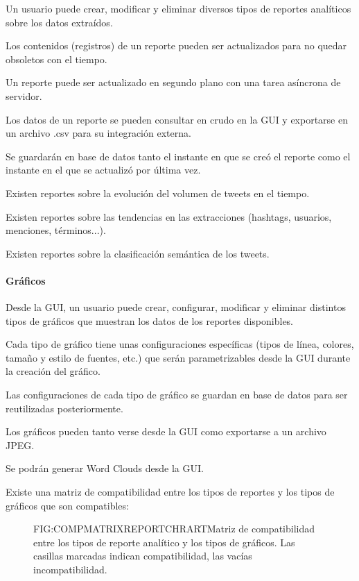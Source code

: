 \begin{functional}
\item Un usuario puede crear, modificar y eliminar diversos tipos de reportes analíticos sobre los datos extraídos.
\item Los contenidos (registros) de un reporte pueden ser actualizados para no quedar obsoletos con el tiempo.
\item Un reporte puede ser actualizado en segundo plano con una tarea asíncrona de servidor.
\item Los datos de un reporte se pueden consultar en crudo en la GUI y exportarse en un archivo .csv para su integración externa.
\item Se guardarán en base de datos tanto el instante en que se creó el reporte como el instante en el que se actualizó por última vez.
\item Existen reportes sobre la evolución del volumen de tweets en el tiempo. 
\item Existen reportes sobre las tendencias en las extracciones (hashtags, usuarios, menciones, términos...).
\item Existen reportes sobre la clasificación semántica de los tweets.
\paragraph{Gráficos}
\item Desde la GUI, un usuario puede crear, configurar, modificar y eliminar distintos tipos de gráficos que muestran los datos de los reportes disponibles.
\item Cada tipo de gráfico tiene unas configuraciones específicas (tipos de línea, colores, tamaño y estilo de fuentes, etc.) que serán parametrizables desde la GUI durante la creación del gráfico. 
\item Las configuraciones de cada tipo de gráfico se guardan en base de datos para ser reutilizadas posteriormente.
\item Los gráficos pueden tanto verse desde la GUI como exportarse a un archivo JPEG.
\item Se podrán generar Word Clouds desde la GUI.
\item Existe una matriz de compatibilidad entre los tipos de reportes y los tipos de gráficos que son compatibles:
\begin{figure}[Matriz de compatibilidad reporte-gráfico]{FIG:COMPMATRIXREPORTCHRART}{Matriz de compatibilidad entre los tipos de reporte analítico y los tipos de gráficos. Las casillas marcadas indican compatibilidad, las vacías incompatibilidad.}
\end{figure}

\end{functional}
